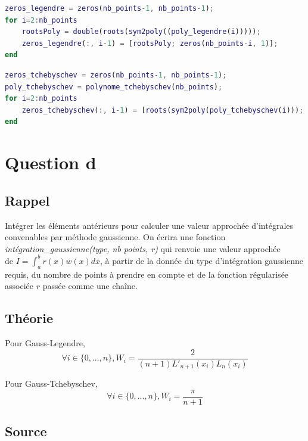 \documentclass[a4paper,10pt]{report}
\begin{document}
\begin{lstlisting}[caption=Zeros de Legendre, language=Matlab]
zeros_legendre = zeros(nb_points-1, nb_points-1);
for i=2:nb_points
    rootsPoly = double(roots(sym2poly((poly_legendre(i)))));
    zeros_legendre(:, i-1) = [rootsPoly; zeros(nb_points-i, 1)];
end
\end{lstlisting}

\begin{lstlisting}[caption=Zeros de Tchebyschev, language=Matlab]
zeros_tchebyschev = zeros(nb_points-1, nb_points-1);
poly_tchebyschev = polynome_tchebyschev(nb_points);
for i=2:nb_points
    zeros_tchebyschev(:, i-1) = [roots(sym2poly(poly_tchebyschev(i))); zeros(nb_points-i, 1)];
end
\end{lstlisting}

\section*{Question d}

\subsection*{Rappel}

Intégrer les éléments antérieurs pour calculer une valeur approchée d’intégrales convenables par méthode gaussienne. On écrira une fonction \textit{intégration\_gaussienne(type, nb points, r)} qui renvoie une valeur approchée \\de $I=\int_{a}^{b}r(x)w(x)dx$, à partir de la donnée du type d’intégration gaussienne requis, du nombre
de points à prendre en compte et de la fonction régularisée associée $r$ passée comme une chaîne.
 

\subsection*{Théorie}
Pour Gauss-Legendre, 
\begin{equation*}
\forall{i} \in \{0, ..., n\}, W_i = \frac{2}{(n+1)L'_{n+1}(x_i)L_{n}(x_i)}
\end{equation*}

Pour Gauss-Tchebyschev,
\begin{equation*}
\forall{i} \in \{0, ..., n\}, W_i = \frac{\pi}{n+1}
\end{equation*}

\subsection*{Source}
\end{document}
